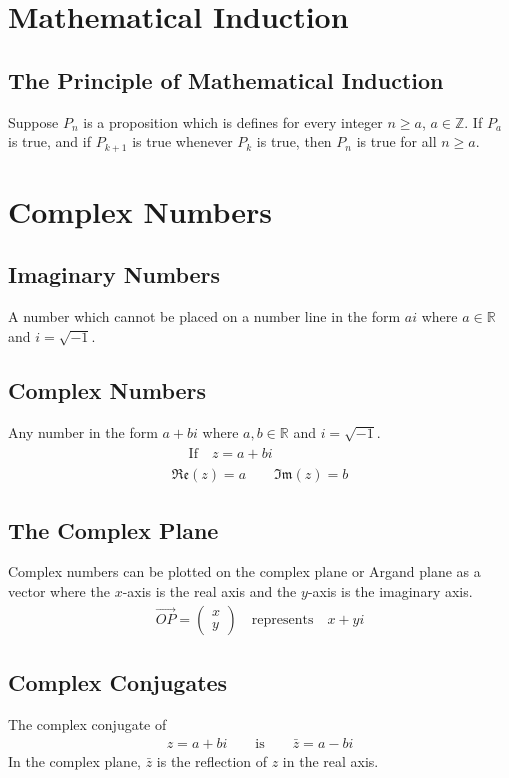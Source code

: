 \documentclass[10pt, a4paper, titlepage]{article}
\begin{document}
\begin{multicols*}{3}
\section{Mathematical Induction}
	\subsection{The Principle of Mathematical Induction}
	Suppose $P_n$ is a proposition which is defines for every integer $n\geq a$, $a\in \mathbb{Z}$. If $P_a$ is true, and if $P_{k+1}$ is true whenever $P_k$ is true, then $P_n$ is true for all $n\geq a$.

\hrulefill
\section{Complex Numbers}
	\subsection{Imaginary Numbers}
	A number which cannot be placed on a number line in the form $ai$ where $a\in \mathbb{R}$ and $i=\sqrt{-1}$.\\

	\dotfill
	\subsection{Complex Numbers}
	Any number in the form $a+bi$ where $a,b\in \mathbb{R}$ and $i=\sqrt{-1}$.
	\begin{gather}
		\begin{flalign}
			&\text{If}\quad z=a+bi&&
		\end{flalign}\\
		\mathfrak{Re} (z)=a\qquad \mathfrak{Im} (z)=b
	\end{gather}

	\dotfill
	\subsection{The Complex Plane}
	Complex numbers can be plotted on the complex plane or Argand plane as a vector where the $x$-axis is the real axis and the $y$-axis is the imaginary axis.
	\begin{align}
		\overrightarrow{OP}=\begin{pmatrix}x\\ y\end{pmatrix}\quad \text{represents}\quad x+yi
	\end{align}
	\dotfill
	\subsection{Complex Conjugates}
	The complex conjugate of
	\begin{align}
		z=a+bi\qquad \text{is}\qquad \bar{z}=a-bi
	\end{align}
	In the complex plane, $\bar{z}$ is the  reflection of $z$ in the real axis.


\end{multicols*}
\end{document}
